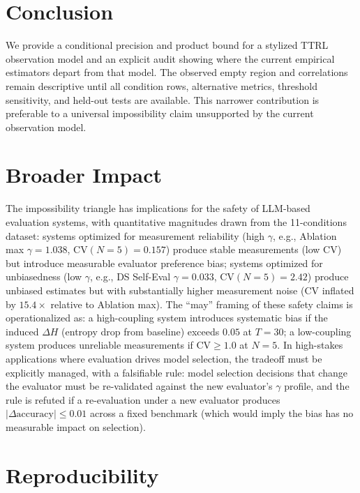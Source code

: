 \documentclass[11pt]{article}
\begin{document}
\section{Conclusion}

We provide a conditional precision and product bound for a stylized TTRL observation model and an explicit audit showing where the current empirical estimators depart from that model. The observed empty region and correlations remain descriptive until all condition rows, alternative metrics, threshold sensitivity, and held-out tests are available. This narrower contribution is preferable to a universal impossibility claim unsupported by the current observation model.

\section*{Broader Impact}

The impossibility triangle has implications for the safety of LLM-based evaluation systems, with quantitative magnitudes drawn from the 11-conditions dataset: systems optimized for measurement reliability (high $\gamma$, e.g., Ablation max $\gamma = 1.038$, $\mathrm{CV}(N{=}5) = 0.157$) produce stable measurements (low $\mathrm{CV}$) but introduce measurable evaluator preference bias; systems optimized for unbiasedness (low $\gamma$, e.g., DS Self-Eval $\gamma = 0.033$, $\mathrm{CV}(N{=}5) = 2.42$) produce unbiased estimates but with substantially higher measurement noise (CV inflated by $15.4\times$ relative to Ablation max). The ``may'' framing of these safety claims is operationalized as: a high-coupling system introduces systematic bias if the induced $\Delta H$ (entropy drop from baseline) exceeds $0.05$ at $T{=}30$; a low-coupling system produces unreliable measurements if $\mathrm{CV} \geq 1.0$ at $N{=}5$. In high-stakes applications where evaluation drives model selection, the tradeoff must be explicitly managed, with a falsifiable rule: model selection decisions that change the evaluator must be re-validated against the new evaluator's $\gamma$ profile, and the rule is refuted if a re-evaluation under a new evaluator produces $|\Delta\text{accuracy}| \leq 0.01$ across a fixed benchmark (which would imply the bias has no measurable impact on selection).

\section*{Reproducibility}
\end{document}
